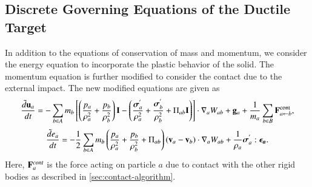 \subsection{Discrete Governing Equations of the Ductile Target}
\label{chap-erosion:sec:discrete-governing-equations}
In addition to the equations of conservation of mass and momentum,
we consider the energy equation to incorporate the plastic behavior of the
solid. The momentum equation is further modified to consider the contact due to
the external impact. The new modified equations are given as
\begin{multline}
\label{eqn:erosion-sph-momentum}
  \frac{\tilde{d}\mathbf{u}_{a}}{dt} = - \sum_{b \in A} m_b \left[
  \left(\frac{p_a}{\rho_a^2} + \frac{p_b}{\rho_b^2}\right) \mathbf{I} -
  \left(\frac{\boldsymbol{\sigma}^{'}_{a}}{\rho_a^2} +
  \frac{\boldsymbol{\sigma}^{'}_{b}}{\rho_b^2} + \Pi_{ab} \mathbf{I} \right) \right]  \cdot \nabla_{a} W_{ab} +
  \mathbf{g}_{a} + \frac{1}{m_a}\sum_{b \in B} \mathbf{F}^{\text{cont}}_{a \leftarrow b},
\end{multline}
\begin{equation}
\label{eqn:erosion-sph-energy}
  \frac{\tilde{d}{e}_{a}}{dt} = - \frac{1}{2} \sum_{b \in A} m_b
  \left(\frac{p_a}{\rho_a^2} + \frac{p_b}{\rho_b^2} + \Pi_{ab} \right)
  \left( \mathbf{v}_a - \mathbf{v}_b \right) \cdot \nabla_{a} W_{ab} +
  \frac{1}{\rho_a} \boldsymbol{\sigma}^{'}_{a} : \boldsymbol{\epsilon_a}.
\end{equation}
Here, $\mathbf{F}^{cont}_{a}$ is the force acting on particle $a$ due to contact
with the other rigid bodies as described in
\cref{sec:contact-algorithm}.

